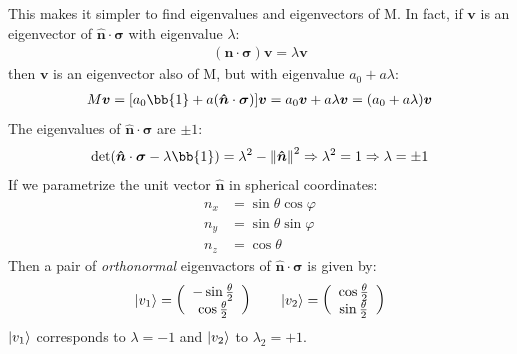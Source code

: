 \documentclass[12pt,a4paper]{report}
\begin{document}
\begin{enumerate}
        This makes it simpler to find eigenvalues and eigenvectors of $\mathrm{M}$. In fact, if $\bm{v}$ is an eigenvector of $\bm{\hat{n}}\cdot \bm{\sigma}$ with eigenvalue $\lambda$:
        \begin{align*}
            (\bm{n} \cdot \bm{\sigma}) \bm{v} = \lambda \bm{v}
        \end{align*}
        then $\bm{v}$ is an eigenvector also of $\mathrm{M}$, but with eigenvalue $a_0 + a \lambda$:
        \begin{align*}
            M \bm{v} = [a_0 \bb{1} + a (\bm{\hat{n}} \cdot \bm{\sigma})] \bm{v} = a_0 \bm{v} + a \lambda \bm{v} = (a_0 + a \lambda) \bm{v}
        \end{align*}
        The eigenvalues of $\bm{\hat{n}}\cdot \bm{\sigma}$ are $\pm 1$:
        \begin{align*}
            \operatorname{det}(\bm{\hat{n}} \cdot \bm{\sigma} - \lambda \bb{1}) = \lambda^2 - \norm{\bm{\hat{n}}}^2 \Rightarrow \lambda^2 = 1 \Rightarrow \lambda = \pm 1 
        \end{align*}
        If we parametrize the unit vector $\bm{\hat{n}}$ in spherical coordinates:
        \begin{align}\label{eqn:n-parameterization}
            n_x &= \sin \theta \cos \varphi\\
            n_y &= \sin \theta \sin \varphi\\ \nonumber
            n_z &= \cos \theta \nonumber
        \end{align}
        Then a pair of \textit{orthonormal} eigenvactors of $\bm{\hat{n}}\cdot \bm{\sigma}$ is given by:
        \begin{align*}
            \ket{v_1} = \left(\begin{array}{c}
            -\sin \frac{\theta}{2}  \\ 
            \cos \frac{\theta}{2} 
            \end{array}\right) \qquad \ket{v_2} = \left(\begin{array}{c}
            \cos \frac{\theta}{2}  \\ 
            \sin \frac{\theta}{2} 
            \end{array}\right)
        \end{align*}
        $\ket{v_1}$ corresponds to $\lambda=-1$ and $\ket{v_2}$ to $\lambda_2 = +1$.

        \medskip


\end{enumerate}
\end{document}
